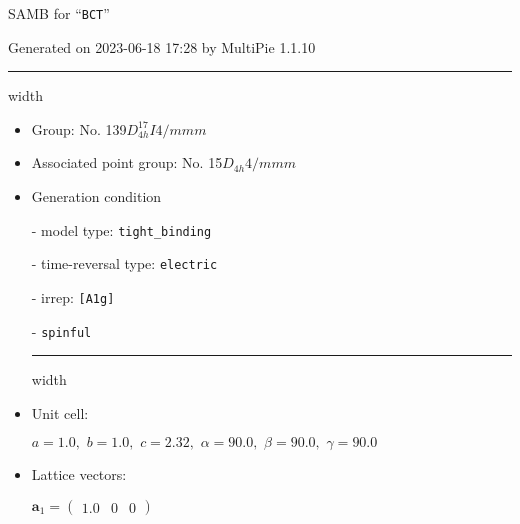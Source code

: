 \documentclass[fleqn,10pt,landscape]{article}
\begin{document}
\setcounter{MaxMatrixCols}{16}

\setlength{\baselineskip}{16pt}
\footnotesize
\begin{center}
\LARGE
SAMB for ``\texttt{BCT}''
\end{center}
\begin{flushright}
Generated on 2023-06-18 17:28 by MultiPie 1.1.10
\end{flushright}
\vspace{1cm}


 \hfil \hrule height 1mm width \textwidth \hfil

\begin{itemize}
\item Group: No. 139\quad$D_{4h}^{17}$\quad$I4/mmm$\quad[ tetragonal ]

\item Associated point group: No. 15\quad$D_{4h}$\quad$4/mmm$\quad[ tetragonal ]

\vspace{5mm}

\item Generation condition

\quad - model type: \texttt{tight_binding}

\quad - time-reversal type: \texttt{electric}

\quad - irrep: \texttt{[A1g]}

\quad - \texttt{spinful}


 \hfil \hrule height 1mm width \textwidth \hfil

\item Unit cell:

\quad $a=1.0,\,\, b=1.0,\,\, c=2.32,\,\, \alpha=90.0,\,\, \beta=90.0,\,\, \gamma=90.0$

\item Lattice vectors:

\quad $\bm{a}_1=\begin{pmatrix} 1.0 & 0 & 0 \end{pmatrix}$


\end{itemize}
\end{document}
